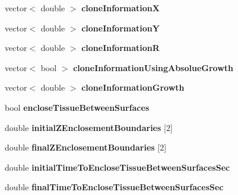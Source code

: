 \begin{DoxyCompactItemize}
\item 
\hypertarget{classSimulation_a81e94b55f267f695f4306ae9047796da}{}vector$<$ double $>$ {\bfseries clone\+Information\+X}\label{classSimulation_a81e94b55f267f695f4306ae9047796da}

\item 
\hypertarget{classSimulation_a36128434ec60a04ce4bb648c79f72848}{}vector$<$ double $>$ {\bfseries clone\+Information\+Y}\label{classSimulation_a36128434ec60a04ce4bb648c79f72848}

\item 
\hypertarget{classSimulation_a9e23247b7d3fc093ec64ac65b12f8421}{}vector$<$ double $>$ {\bfseries clone\+Information\+R}\label{classSimulation_a9e23247b7d3fc093ec64ac65b12f8421}

\item 
\hypertarget{classSimulation_a6d8b7803f55b4c2d55c1a433286f9acd}{}vector$<$ bool $>$ {\bfseries clone\+Information\+Using\+Absolue\+Growth}\label{classSimulation_a6d8b7803f55b4c2d55c1a433286f9acd}

\item 
\hypertarget{classSimulation_a6b077f65fab62999cd6e5d02633188be}{}vector$<$ double $>$ {\bfseries clone\+Information\+Growth}\label{classSimulation_a6b077f65fab62999cd6e5d02633188be}

\item 
\hypertarget{classSimulation_a5f78710998d8706eb7e15857eb03ccc6}{}bool {\bfseries enclose\+Tissue\+Between\+Surfaces}\label{classSimulation_a5f78710998d8706eb7e15857eb03ccc6}

\item 
\hypertarget{classSimulation_a4b273b605ad9f2dafb4b4ea22b3a4d92}{}double {\bfseries initial\+Z\+Enclosement\+Boundaries} \mbox{[}2\mbox{]}\label{classSimulation_a4b273b605ad9f2dafb4b4ea22b3a4d92}

\item 
\hypertarget{classSimulation_a8741a8f397eceac3a4f7d40009ada8a4}{}double {\bfseries final\+Z\+Enclosement\+Boundaries} \mbox{[}2\mbox{]}\label{classSimulation_a8741a8f397eceac3a4f7d40009ada8a4}

\item 
\hypertarget{classSimulation_adc4fdde612c109d01508eb4c8d49f76a}{}double {\bfseries initial\+Time\+To\+Enclose\+Tissue\+Between\+Surfaces\+Sec}\label{classSimulation_adc4fdde612c109d01508eb4c8d49f76a}

\item 
\hypertarget{classSimulation_ab7ef2d249b5d20a2fc0bc399a2b34e6d}{}double {\bfseries final\+Time\+To\+Enclose\+Tissue\+Between\+Surfaces\+Sec}\label{classSimulation_ab7ef2d249b5d20a2fc0bc399a2b34e6d}


\end{DoxyCompactItemize}
